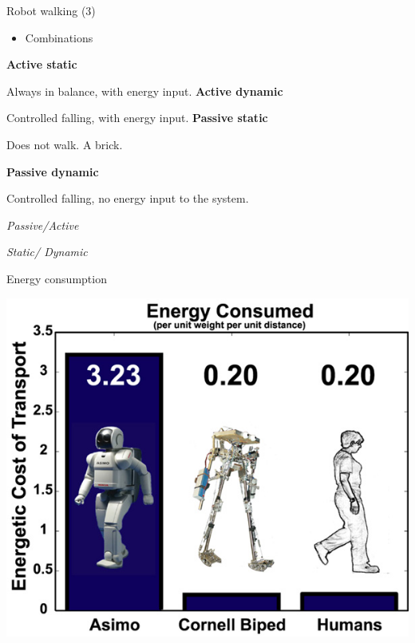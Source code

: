 \documentclass[compress]{beamer}
\begin{document}
\begin{frame}{Robot walking (3)}

    \begin{itemize}

        \item Combinations
    \end{itemize}

    \textbf{Active static}


    Always in balance, with energy input.
    \textbf{Active dynamic}

    Controlled falling, with energy input.
    \textbf{Passive static}


    Does not walk. A brick.

    \textbf{Passive dynamic}

    Controlled falling, no energy input to the system.

    \emph{Passive/Active}

    \emph{Static/ Dynamic}

\end{frame}

\begin{frame}{Energy consumption}

    \begin{center}
        \includegraphics[width=0.8\linewidth]{image14}
    \end{center}
\end{frame}
\end{document}
